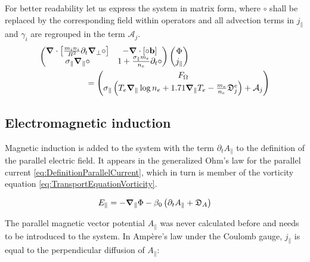 For better readability let us express the system in matrix form, where $\circ$ shall be replaced by the corresponding field within operators and all advection terms in $j_\parallel$ and $\gamma_i$ are regrouped in the term $\mathcal{A}_j$. 
\begin{align}
	\makebox[0.8\textwidth][l]{$\displaystyle
		\begin{pmatrix}
			\grad\cdot\left[\frac{m_i n_i}{ B^2}\partial_t\grad_\perp\circ\right] & 
			- \grad\cdot\left[\circ\mathbf{b}\right] \\
			\sigma_\parallel\grad_\parallel\circ &
			1 + \frac{\sigma_\parallel m_e}{n_e}\partial_t \circ
		\end{pmatrix}
		\begin{pmatrix}
			\Phi \\ j_\parallel
		\end{pmatrix}
		$} \nonumber \\	
	\makebox[0.8\textwidth][r]{$\displaystyle
		=\begin{pmatrix}
			F_\Omega \\
			\sigma_\parallel\left(T_e\grad_\parallel\log n_e + 1.71\grad_\parallel T_e - \frac{m_e}{n_e}\mathfrak{D}_j^e \right) + \mathcal{A}_j		
		\end{pmatrix}
		$} \label{eq:S3X_vorticityEquation_ElectronInertia_matrix}
\end{align}






\subsection{Electromagnetic induction}

Magnetic induction is added to the system with the term $\partial_t A_\parallel$ to the definition of the parallel electric field. It appears in the generalized Ohm's law for the parallel current \ref{eq:DefinitionParallelCurrent}, which in turn is member of the vorticity equation \ref{eq:TransportEquationVorticity}.

\begin{equation}
	\label{eq:electricField_eq_gradPhi_p_dtA}
	E_\parallel = -\grad_\parallel\Phi - \beta_0\left(\partial_t A_\parallel + \mathfrak{D}_A\right)
\end{equation}

The parallel magnetic vector potential $A_\parallel$ was never calculated before and needs to be introduced to the system. In Ampère's law under the Coulomb gauge, $j_\parallel$ is equal to the perpendicular diffusion of $A_\parallel$: 

